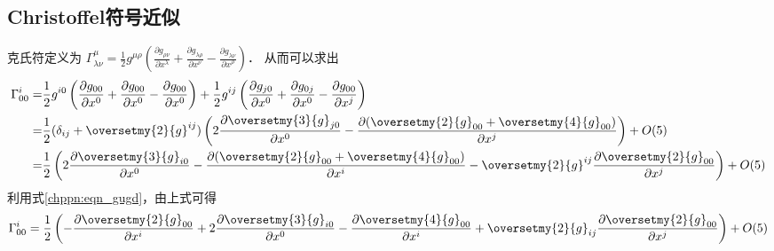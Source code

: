 \subsection{Christoffel符号近似}
克氏符定义为
$    \Gamma^\mu_{\lambda\nu}=\frac{1}{2}g^{\mu\rho}(
      \frac{\partial g_{\rho\nu}}{\partial x^\lambda}
     +\frac{\partial g_{\lambda\rho}}{\partial x^\nu}
     -\frac{\partial g_{\lambda\nu}}{\partial x^\rho} ) $．
从而可以求出
\begin{align*}
    \Gamma^i_{00}=&\frac{1}{2}g^{i0}\left(
     \frac{\partial g_{0 0}}{\partial x^0}
    +\frac{\partial g_{0 0}}{\partial x^0}
    -\frac{\partial g_{00}}{\partial x^0} \right)
    +\frac{1}{2}g^{ij}\left(
    \frac{\partial g_{j 0}}{\partial x^0}
    +\frac{\partial g_{0 j}}{\partial x^0}
    -\frac{\partial g_{00}}{\partial x^j} \right) \\
    =& \frac{1}{2}(\delta_{ij}+\oversetmy{2}{g}^{ij})\left(
    2\frac{\partial \oversetmy{3}{g}_{j0}}{\partial x^0}
    -\frac{\partial (\oversetmy{2}{g}_{00}+\oversetmy{4}{g}_{00})}
      {\partial x^j} \right) + O(5)\\
    =& \frac{1}{2} \left(
    2\frac{\partial \oversetmy{3}{g}_{i0}}{\partial x^0}
    -\frac{\partial (\oversetmy{2}{g}_{00}+\oversetmy{4}{g}_{00})} {\partial x^i}
    -\oversetmy{2}{g}^{ij} \frac{\partial \oversetmy{2}{g}_{00}}{\partial x^j}
      \right) + O(5)
\end{align*}
利用式\eqref{chppn:eqn_gugd}，由上式可得
\begin{equation}
    \Gamma^i_{00}= \frac{1}{2} \left(
    -\frac{\partial \oversetmy{2}{g}_{00}} {\partial x^i}
    +2\frac{\partial \oversetmy{3}{g}_{i0}}{\partial x^0}
    -\frac{\partial \oversetmy{4}{g}_{00}} {\partial x^i}
    +\oversetmy{2}{g}_{ij} \frac{\partial \oversetmy{2}{g}_{00}}{\partial x^j}
    \right) + O(5)
\end{equation}
